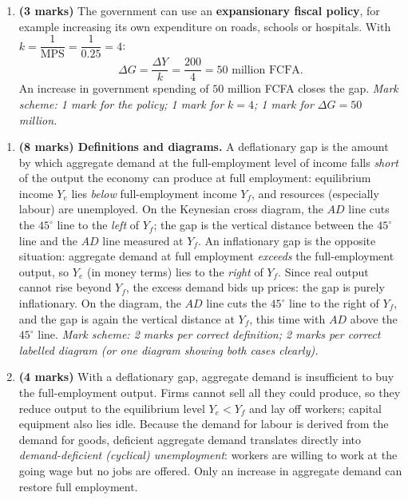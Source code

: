\documentclass[11pt]{article}
\newcommand{\cle}[1]{{\popxbold\color{popdark}#1}}
\begin{document}
\begin{corrige}
\begin{enumerate}
\item \textbf{(3 marks)} The government can use an \textbf{expansionary fiscal policy}, for example increasing its own expenditure on roads, schools or hospitals. With $k = \dfrac{1}{\text{MPS}} = \dfrac{1}{0.25} = 4$:
\[ \Delta G = \frac{\Delta Y}{k} = \frac{200}{4} = 50 \text{ million FCFA}. \]
An increase in government spending of $50$ million FCFA closes the gap. \emph{Mark scheme: 1 mark for the policy; 1 mark for $k = 4$; 1 mark for $\Delta G = 50$ million.}
\end{enumerate}
\end{corrige}

\begin{corrige}
\begin{enumerate}
\item \textbf{(8 marks) Definitions and diagrams.} A \cle{deflationary gap} is the amount by which aggregate demand at the full-employment level of income falls \emph{short} of the output the economy can produce at full employment: equilibrium income $Y_e$ lies \emph{below} full-employment income $Y_f$, and resources (especially labour) are unemployed. On the Keynesian cross diagram, the $AD$ line cuts the $45^{\circ}$ line to the \emph{left} of $Y_f$; the gap is the vertical distance between the $45^{\circ}$ line and the $AD$ line measured at $Y_f$. An \cle{inflationary gap} is the opposite situation: aggregate demand at full employment \emph{exceeds} the full-employment output, so $Y_e$ (in money terms) lies to the \emph{right} of $Y_f$. Since real output cannot rise beyond $Y_f$, the excess demand bids up prices: the gap is purely inflationary. On the diagram, the $AD$ line cuts the $45^{\circ}$ line to the right of $Y_f$, and the gap is again the vertical distance at $Y_f$, this time with $AD$ above the $45^{\circ}$ line. \emph{Mark scheme: 2 marks per correct definition; 2 marks per correct labelled diagram (or one diagram showing both cases clearly).}
\item \textbf{(4 marks)} With a deflationary gap, aggregate demand is insufficient to buy the full-employment output. Firms cannot sell all they could produce, so they reduce output to the equilibrium level $Y_e < Y_f$ and lay off workers; capital equipment also lies idle. Because the demand for labour is derived from the demand for goods, deficient aggregate demand translates directly into \emph{demand-deficient (cyclical) unemployment}: workers are willing to work at the going wage but no jobs are offered. Only an increase in aggregate demand can restore full employment.

\end{enumerate}
\end{corrige}
\end{document}
